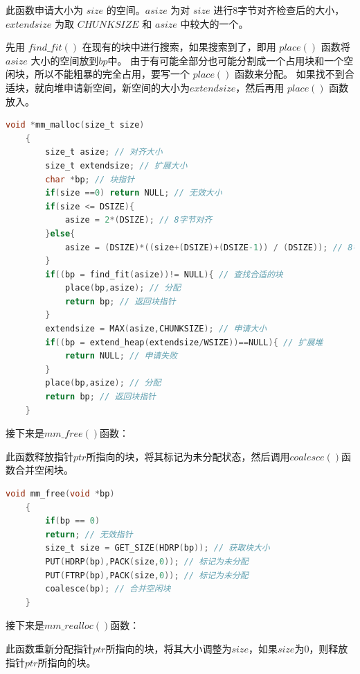 此函数申请大小为 $size$ 的空间。$asize$ 为对 $size$ 进行$8$字节对齐检查后的大小，$extendsize$ 为取 $CHUNKSIZE$ 和 $asize$ 中较大的一个。

先用 $find\_fit()$ 在现有的块中进行搜索，如果搜索到了，即用 $place()$ 函数将 $asize$ 大小的空间放到$bp$中。
由于有可能全部分也可能分割成一个占用块和一个空闲块，所以不能粗暴的完全占用，要写一个 $place()$ 函数来分配。
如果找不到合适块，就向堆申请新空间，新空间的大小为$extendsize$，然后再用 $place()$ 函数放入。

\begin{lstlisting}[language = C , title = { mm\_malloc.c } ]
    void *mm_malloc(size_t size)
    {
        size_t asize; // 对齐大小
        size_t extendsize; // 扩展大小
        char *bp; // 块指针
        if(size ==0) return NULL; // 无效大小
        if(size <= DSIZE){
            asize = 2*(DSIZE); // 8字节对齐
        }else{
            asize = (DSIZE)*((size+(DSIZE)+(DSIZE-1)) / (DSIZE)); // 8字节对齐
        }
        if((bp = find_fit(asize))!= NULL){ // 查找合适的块
            place(bp,asize); // 分配
            return bp; // 返回块指针
        }
        extendsize = MAX(asize,CHUNKSIZE); // 申请大小
        if((bp = extend_heap(extendsize/WSIZE))==NULL){ // 扩展堆
            return NULL; // 申请失败
        }
        place(bp,asize); // 分配
        return bp; // 返回块指针
    }
\end{lstlisting}

接下来是$mm\_free()$函数：

此函数释放指针$ptr$所指向的块，将其标记为未分配状态，然后调用$coalesce()$函数合并空闲块。

\begin{lstlisting}[language = C , title = { mm\_free.c } ]
    void mm_free(void *bp)
    {
        if(bp == 0)
        return; // 无效指针
        size_t size = GET_SIZE(HDRP(bp)); // 获取块大小
        PUT(HDRP(bp),PACK(size,0)); // 标记为未分配
        PUT(FTRP(bp),PACK(size,0)); // 标记为未分配
        coalesce(bp); // 合并空闲块
    }
\end{lstlisting}

接下来是$mm\_realloc()$函数：

此函数重新分配指针$ptr$所指向的块，将其大小调整为$size$，如果$size$为$0$，则释放指针$ptr$所指向的块。

